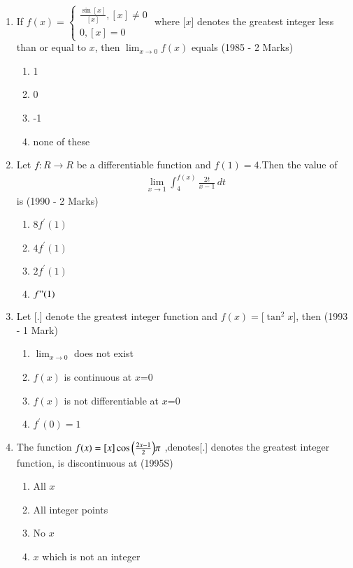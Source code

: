 \documentclass[journal,12pt,onecolumn]{IEEEtran}
\theoremstyle{remark}
\begin{document}
\begin{enumerate}
\begin{enumerate}
                 \end{enumerate}

\item If $f(x)=\begin{cases}
    \frac{\sin[x]}{[x]}, [x]\neq 0\\ 0 ,  [x]=0\end{cases}$   where [$x$] denotes the greatest integer less than or equal to $x$, then $\lim_{x\to 0}f(x)$ equals
    \hfill                (1985 - 2 Marks)
    \begin{enumerate}
        \item 1
        \item 0
        \item -1
        \item none of these
    \end{enumerate}

\item Let $f:R\to R$ be a differentiable function and $f(1)=4$.Then the value of
\begin{align}
 \: \lim_{x\to 1}\int_{4}^{f(x)}\frac{2t}{x-1}\,dt 
 \end{align}
 is
\hfill(1990 - 2 Marks)
 \begin{enumerate}
     \item 8$f^{\prime}(1)$
     \item $4f^{\prime}(1)$
     \item $2f^{\prime}(1)$
     \item $f"(1)$
     
     
 \end{enumerate}

\item Let [.] denote the greatest integer function and $f(x)=[\tan^2{x}$], then
\hfill(1993 - 1 Mark)
    \begin{enumerate}
        \item $\lim_{x\to 0}$ does not exist
        \item $f(x)$ is continuous at $x$=0
        \item $f(x)$ is not differentiable at $x$=0
        \item $f^{\prime}(0)=1$
        
    \end{enumerate}

\item The function $f(x)=[x]\cos{\ensuremath{\left(\frac{2x-1}{2}\right)}}\pi$ ,denotes[.] denotes the greatest integer function, is discontinuous at
\hfill(1995S)
   \begin{enumerate}
       \item All $x$
       \item All integer points
       \item No $x$
       \item $x$ which is not an integer
   \end{enumerate}


\end{enumerate}
\end{document}
